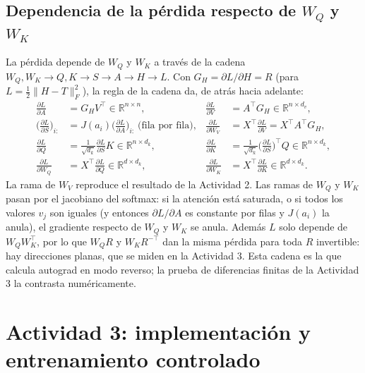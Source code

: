 \documentclass[10pt]{article}
\newcommand{\R}{\mathbb{R}}
\begin{document}
\subsection{Dependencia de la pérdida respecto de $W_Q$ y $W_K$}\label{sec:dependencia}
La pérdida depende de $W_Q$ y $W_K$ a través de la cadena
$W_Q, W_K \to Q, K \to S \to A \to H \to L$. Con $G_H = \partial L/\partial H = R$ (para
$L = \tfrac12\|H-T\|_F^2$), la regla de la cadena da, de atrás hacia adelante:
\begin{align*}
  \frac{\partial L}{\partial A} &= G_H V^\top \in\R^{n\times n}, &
  \frac{\partial L}{\partial V} &= A^\top G_H \in\R^{n\times d_v},\\
  \Big(\frac{\partial L}{\partial S}\Big)_{i:} &= J(a_i)\Big(\frac{\partial L}{\partial A}\Big)_{i:}
  \ \text{(fila por fila)}, &
  \frac{\partial L}{\partial W_V} &= X^\top \frac{\partial L}{\partial V} = X^\top A^\top G_H,\\
  \frac{\partial L}{\partial Q} &= \frac{1}{\sqrt{d_k}}\frac{\partial L}{\partial S}K\in\R^{n\times d_k}, &
  \frac{\partial L}{\partial K} &= \frac{1}{\sqrt{d_k}}\Big(\frac{\partial L}{\partial S}\Big)^{\!\top} Q\in\R^{n\times d_k},\\
  \frac{\partial L}{\partial W_Q} &= X^\top\frac{\partial L}{\partial Q}\in\R^{d\times d_k}, &
  \frac{\partial L}{\partial W_K} &= X^\top\frac{\partial L}{\partial K}\in\R^{d\times d_k}.
\end{align*}
La rama de $W_V$ reproduce el resultado de la Actividad 2. Las ramas de $W_Q$ y $W_K$ pasan por el
jacobiano del softmax: si la atención está saturada, o si todos los valores $v_j$ son iguales (y
entonces $\partial L/\partial A$ es constante por filas y $J(a_i)$ la anula), el gradiente respecto
de $W_Q$ y $W_K$ se anula. Además $L$ solo depende de $W_QW_K^\top$, por lo que $W_QR$ y
$W_KR^{-\top}$ dan la misma pérdida para toda $R$ invertible: hay direcciones planas, que se miden en
la Actividad 3. Esta cadena es la que calcula autograd en modo reverso; la prueba de diferencias
finitas de la Actividad 3 la contrasta numéricamente.

\section{Actividad 3: implementación y entrenamiento controlado}
\end{document}
